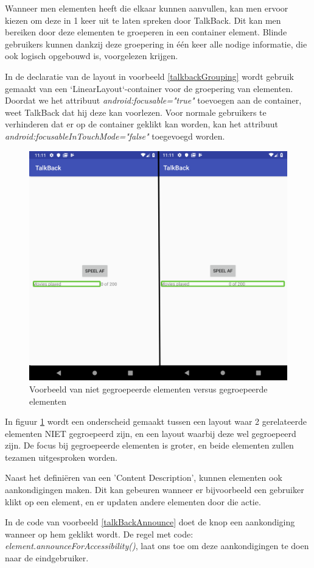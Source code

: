 Wanneer men elementen heeft die elkaar kunnen aanvullen, kan men ervoor kiezen om deze in 1 keer uit te laten spreken door TalkBack. Dit kan men bereiken door deze elementen te groeperen in een container element. Blinde gebruikers kunnen dankzij deze groepering in één keer alle nodige informatie, die ook logisch opgebouwd is, voorgelezen krijgen.

In de declaratie van de layout in voorbeeld \ref{talkbackGrouping} wordt gebruik gemaakt van een `LinearLayout`-container voor de groepering van elementen. Doordat we het attribuut \emph{android:focusable="true"} toevoegen aan de container, weet TalkBack dat hij deze kan voorlezen. Voor normale gebruikers te verhinderen dat er op de container geklikt kan worden, kan het attribuut \emph{android:focusableInTouchMode="false"}  toegevoegd worden.
\begin{figure}[h!]
    \centering
    \includegraphics[width=0.6\linewidth]{img/talkback_grouped_vs_notgrouped}
    \caption{Voorbeeld van niet gegroepeerde elementen versus gegroepeerde elementen}
    \label{fig:talkbackgroupedvsnotgrouped}
\end{figure}

In figuur \ref{fig:talkbackgroupedvsnotgrouped} wordt een onderscheid gemaakt tussen een layout waar 2 gerelateerde elementen NIET gegroepeerd zijn, en een layout waarbij deze wel gegroepeerd zijn. De focus bij gegroepeerde elementen is groter, en beide elementen zullen tezamen uitgesproken worden. 

Naast het definiëren van een 'Content Description', kunnen elementen ook aankondigingen maken. Dit kan gebeuren wanneer er bijvoorbeeld een gebruiker klikt op een element, en er updaten andere elementen door die actie.

In de code van voorbeeld \ref{talkBackAnnounce} doet de knop een aankondiging wanneer op hem geklikt wordt. De regel met code: \emph{element.announceForAccessibility()}, laat ons toe om deze aankondigingen te doen naar de eindgebruiker.

